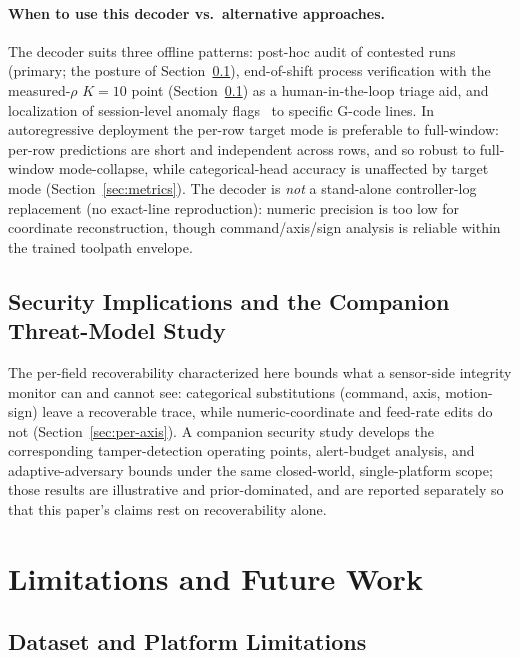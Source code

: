 \documentclass[sensors,article,submit,moreauthors,pdftex]{Definitions/mdpi}
\begin{document}
\paragraph{When to use this decoder vs.\ alternative approaches.}\label{sec:disc-when-to-use} The decoder suits three offline patterns: post-hoc audit of contested runs (primary; the posture of Section~\ref{sec:disc-threat-model}), end-of-shift process verification with the measured-$\rho$ $K\!=\!10$ point (Section~\ref{sec:disc-threat-model}) as a human-in-the-loop triage aid, and localization of session-level anomaly flags~\cite{coelho2024anomaly,kimmell2025cnc} to specific G-code lines. In autoregressive deployment the per-row target mode is preferable to full-window: per-row predictions are short and independent across rows, and so robust to full-window mode-collapse, while categorical-head accuracy is unaffected by target mode (Section~\ref{sec:metrics}). The decoder is \emph{not} a stand-alone controller-log replacement (no exact-line reproduction): numeric precision is too low for coordinate reconstruction, though command/axis/sign analysis is reliable within the trained toolpath envelope.


\subsection{Security Implications and the Companion Threat-Model Study}
\label{sec:disc-threat-model}

The per-field recoverability characterized here bounds what a sensor-side integrity monitor can and cannot see: categorical substitutions (command, axis, motion-sign) leave a recoverable trace, while numeric-coordinate and feed-rate edits do not (Section~\ref{sec:per-axis}). A companion security study develops the corresponding tamper-detection operating points, alert-budget analysis, and adaptive-adversary bounds under the same closed-world, single-platform scope; those results are illustrative and prior-dominated, and are reported separately so that this paper's claims rest on recoverability alone.

\section{Limitations and Future Work}
\label{sec:future}

\subsection{Dataset and Platform Limitations}
\label{sec:lim-dataset}
\end{document}

